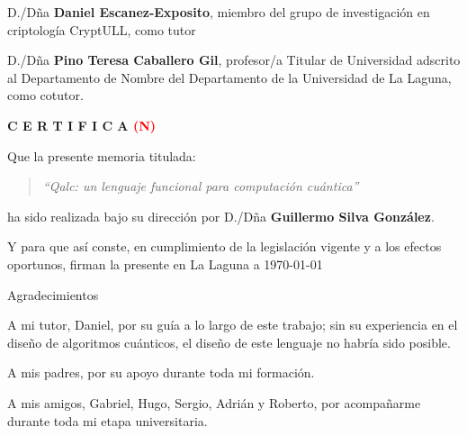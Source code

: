 \documentclass[a4paper,12pt,oneside]{scrbook}
\numberwithin{equation}{chapter}
\begin{document}
{
\setlength\parindent{0pt}
    D./Dña \textbf{Daniel Escanez-Exposito}, miembro del grupo de investigación en criptología CryptULL, como tutor
    
    \bigskip
    D./Dña \textbf{Pino Teresa Caballero Gil}, profesor/a Titular de Universidad adscrito al Departamento de Nombre del Departamento de la Universidad de La Laguna, como cotutor.
    
    \bigskip
    \bigskip
    \textbf{C E R T I F I C A \textcolor{red}{(N)}}

    \bigskip
    Que la presente memoria titulada:
    
    \bigskip
    \begin{quote}
    \textit{``Qalc: un lenguaje funcional para computación cuántica''}
    \end{quote}
    
    \bigskip
    \noindent ha sido realizada bajo su dirección por D./Dña \textbf{Guillermo Silva González}.
    
    \bigskip
    Y para que así conste, en cumplimiento de la legislación vigente y a los efectos
    oportunos, firman la presente en La Laguna a \today
}

\thispagestyle{empty}

\begin{flushright}
    \setlength{\parindent}{0mm}

    {\LARGE Agradecimientos}
    \vspace{15mm}
    
    \begin{large}
        \begin{minipage}{0.75\textwidth}
            \begin{flushright}
            A mi tutor, Daniel, por su guía a lo largo de este trabajo; sin su experiencia en el diseño de algoritmos cuánticos, el diseño de este lenguaje no habría sido posible.

            A mis padres, por su apoyo durante toda mi formación.

            A mis amigos, Gabriel, Hugo, Sergio, Adrián y Roberto, por acompañarme durante toda mi etapa universitaria.
            \end{flushright}
        \end{minipage}
    \end{large}
\end{flushright}
\end{document}

